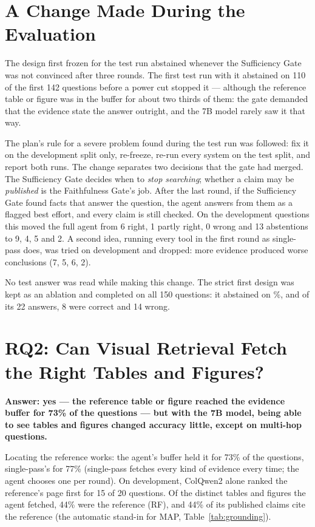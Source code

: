\section{A Change Made During the Evaluation}
\label{sec:best-effort}

The design first frozen for the test run abstained whenever the Sufficiency Gate was
not convinced after three rounds. The first test run with it abstained on 110 of the
first 142 questions before a power cut stopped it --- although the reference table or
figure was in the buffer for about two thirds of them: the gate demanded that the
evidence state the answer outright, and the 7B model rarely saw it that way.

The plan's rule for a severe problem found during the test run was followed: fix it on
the development split only, re-freeze, re-run every system on the test split, and
report both runs. The change separates two decisions that the gate had merged. The
Sufficiency Gate decides when to \emph{stop searching}; whether a claim may be
\emph{published} is the Faithfulness Gate's job. After the last round, if the
Sufficiency Gate found facts that answer the question, the agent answers from them as
a flagged best effort, and every claim is still checked. On the development
questions this moved the full agent from 6 right, 1 partly right, 0 wrong and 13
abstentions to 9, 4, 5 and 2. A second idea, running every tool in the first round as
single-pass does, was tried on development and dropped: more evidence produced worse
conclusions (7, 5, 6, 2).

No test answer was read while making this change. The strict first design was kept
as an ablation and completed on all 150 questions: it abstained on \nStrictAbstain\%,
and of its 22 answers, 8 were correct and 14 wrong.

\section{RQ2: Can Visual Retrieval Fetch the Right Tables and Figures?}

\textbf{Answer: yes --- the reference table or figure reached the evidence buffer for
73\% of the questions --- but with the 7B model, being able to see tables and figures
changed accuracy little, except on multi-hop questions.}

Locating the reference works: the agent's buffer held it for 73\% of the questions,
single-pass's for 77\% (single-pass fetches every kind of evidence every time; the
agent chooses one per round). On development, ColQwen2 alone ranked the reference's
page first for 15 of 20 questions. Of the distinct tables and figures the agent
fetched, 44\% were the reference (RF), and 44\% of its published claims cite the
reference (the automatic stand-in for MAP, Table~\ref{tab:grounding}).

